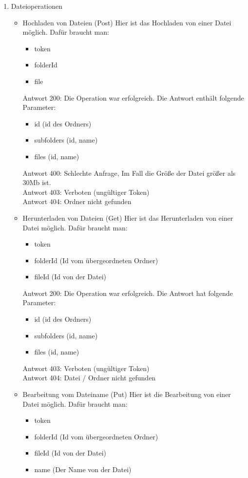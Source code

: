 \documentclass[a4paper,twoside]{article}
\begin{document}
\begin{enumerate}
		\item Dateioperationen
		\begin{itemize}
			\item Hochladen von Dateien (Post)
			Hier ist das Hochladen von einer Datei m\"oglich. Daf\"ur braucht man: 
			\begin{itemize}
				\item token
				\item folderId 
				\item file
			\end{itemize}
			Antwort 200: Die Operation war erfolgreich. Die Antwort enth\"alt folgende Parameter:
			\begin{itemize}
				\item id (id des Ordners)
				\item subfolders (id, name)
				\item files (id, name)
			\end{itemize}
			Antwort 400: Schlechte Anfrage, Im Fall die Gr\"o{\ss}e der Datei gr\"o{\ss}er als 30Mb ist. \\
			Antwort 403: Verboten (ung\"ultiger Token) \\
			Antwort 404: Ordner nicht gefunden
			\item Herunterladen von Dateien (Get)
			Hier ist das Herunterladen von einer Datei m\"oglich. Daf\"ur braucht man:
			\begin{itemize}
				\item token
				\item folderId (Id vom \"ubergeordneten Ordner)
				\item fileId (Id von der Datei)
			\end{itemize}
			Antwort 200: Die Operation war erfolgreich. Die Antwort hat folgende Parameter:
			\begin{itemize}
				\item id (id des Ordners)
				\item subfolders (id, name)
				\item files (id, name)
			\end{itemize}
			Antwort 403: Verboten (ung\"ultiger Token) \\
			Antwort 404: Datei / Ordner nicht gefunden
			\item Bearbeitung vom Dateiname (Put)
			Hier ist die Bearbeitung von einer Datei m\"oglich. Daf\"ur braucht man:
			\begin{itemize}
				\item token
				\item folderId (Id vom \"ubergeordneten Ordner)
				\item fileId (Id von der Datei)
				\item name (Der Name von der Datei) 
			\end{itemize}
			

\end{itemize}
\end{enumerate}
\end{document}
